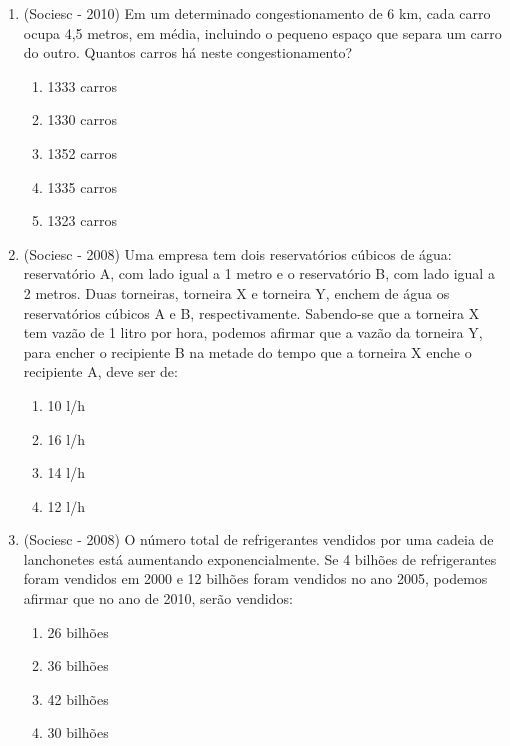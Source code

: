 \begin{enumerate}
 \item (Sociesc - 2010) Em um determinado congestionamento de 6 km, cada carro ocupa 4,5 metros, em média, incluindo o pequeno espaço que separa um carro do outro. Quantos carros há neste congestionamento?
  \begin{enumerate}
  \item 1333 carros
  \item 1330 carros
  \item 1352 carros
  \item 1335 carros
  \item 1323 carros
 \end{enumerate}

 \item (Sociesc - 2008) Uma empresa tem dois reservatórios cúbicos de água: reservatório A, com lado igual a 1 metro e o reservatório B, com lado igual a 2 metros. Duas torneiras, torneira X e torneira Y, enchem de água os reservatórios cúbicos A e B, respectivamente. Sabendo-se que a torneira X tem vazão de 1 litro por hora, podemos afirmar que a vazão da torneira Y, para encher o recipiente B na metade do tempo que a torneira X enche o recipiente A, deve ser de:
  \begin{enumerate}
  \item 10 l/h
  \item 16 l/h
  \item 14 l/h
  \item 12 l/h
 \end{enumerate}

 \item (Sociesc - 2008) O número total de refrigerantes vendidos por uma cadeia de lanchonetes está aumentando exponencialmente. Se 4 bilhões de refrigerantes foram vendidos em 2000 e 12 bilhões foram vendidos no ano 2005, podemos afirmar que no ano de 2010, serão vendidos:
  \begin{enumerate}
  \item 26 bilhões
  \item 36 bilhões
  \item 42 bilhões
  \item 30 bilhões
 \end{enumerate}


\end{enumerate}
